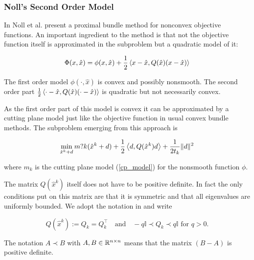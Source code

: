 
\subsubsection{Noll's Second Order Model}

In \cite{Noll2012} Noll et al. present a proximal bundle method for nonconvex objective functions. An important ingredient to the method is that not the objective function itself is approximated in the subproblem but a quadratic model of it:

\begin{equation}
	\Phi(x,\hat{x}) = \phi(x,\hat{x})+\frac{1}{2}\left\langle x-\hat{x},Q(\hat{x})(x-\hat{x})\right\rangle
\end{equation}

The first order model \(\phi(\cdot,\hat{x})\) is convex and possibly nonsmooth. The second order part \(\frac{1}{2}\left\langle \cdot-\hat{x},Q(\hat{x})(\cdot-\hat{x})\right\rangle\) is quadratic but not necessarily convex.

As the first order part of this model is convex it can be approximated by a cutting plane model just like the objective function in usual convex bundle methods. The subproblem emerging from this approach is

\begin{equation*}
	\min_{\hat{x}^k+d} m?k(\hat{x}^k+d)+\frac{1}{2}\left\langle d,Q(\hat{x}^k)d \right\rangle + \frac{1}{2t_k}\|d\|^2
\label{sub_prob_Noll}
\end{equation*} 

where \(m_k\) is the cutting plane model (\ref{cp_model}) for the nonsmooth function \(\phi\).

The matrix \(Q(\hat{x}^k)\) itself does not have to be positive definite. In fact the only conditions put on this matrix are that it is symmetric and that all eigenvalues are uniformly bounded.
We adopt the notation in \cite{Noll2013} and write

\begin{equation*}
		Q(\hat{x}^k):=Q_k = Q_k^{\top} \quad \text{and} \quad -q\mathbb{I} \prec Q_k \prec q\mathbb{I} \text{ for } q > 0.
\end{equation*}

The notation \( A \prec B\) with \(A, B \in \mathbb{R}^{n\times n}\) means that the matrix \((B-A)\) is positive definite.


